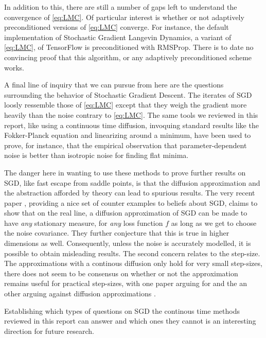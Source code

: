 \documentclass[11pt,twoside]{article}
\theoremstyle{definition}
\begin{document}
In addition to this, there are still a number of gaps left to understand the convergence of \eqref{eq:LMC}. Of particular interest is whether or not adaptively preconditioned versions of \eqref{eq:LMC} converge. For instance, the default implementation of Stochastic Gradient Langevin Dynamics, a variant of \eqref{eq:LMC}, of TensorFlow is preconditioned with RMSProp. There is to date no convincing proof that this algorithm, or any adaptively preconditioned scheme works.  

A final line of inquiry that we can pursue from here are the questions surrounding the behavior of Stochastic Gradient Descent. The iterates of SGD loosly ressemble those of \eqref{eq:LMC} except that they weigh the gradient more heavily than the noise contrary to \eqref{eq:LMC}. The same tools we reviewed in this report, like using a continuous time diffusion, invoquing standard results like the Fokker-Planck equation and linearizing around a minimum, have been used to prove, for instance, that the empirical observation that parameter-dependent noise is better than isotropic noise for finding flat minima. 

The danger here in wanting to use these methods to prove further results on SGD, like fast escape from saddle points, is that the diffusion approximation and the abstraction afforded by theory can lead to spurious results. The very recent paper \cite{ziyin_sgd_2021}, providing a nice set of counter examples to beliefs about SGD, claims to show that on the real line, a diffusion approximation of SGD can be made to have \textit{any} stationary measure, for \textit{any} loss function $f$ as long as we get to choose the noise covariance. They further conjecture that this is true in higher dimensions as well. Consequently, unless the noise is accurately modelled, it is possible to obtain misleading results. The second concern relates to the step-size. The approximations with a continous diffusion only hold for very small step-sizes,  there does not seem to be consensus on whether or not the approximation remains useful for practical step-sizes, with one paper arguing for \cite{} and the an other arguing against diffusion approximations \cite{}.

Establishing which types of questions on SGD the continous time methods reviewed in this report can answer and which ones they cannot is an interesting direction for future research. 




\end{document}
